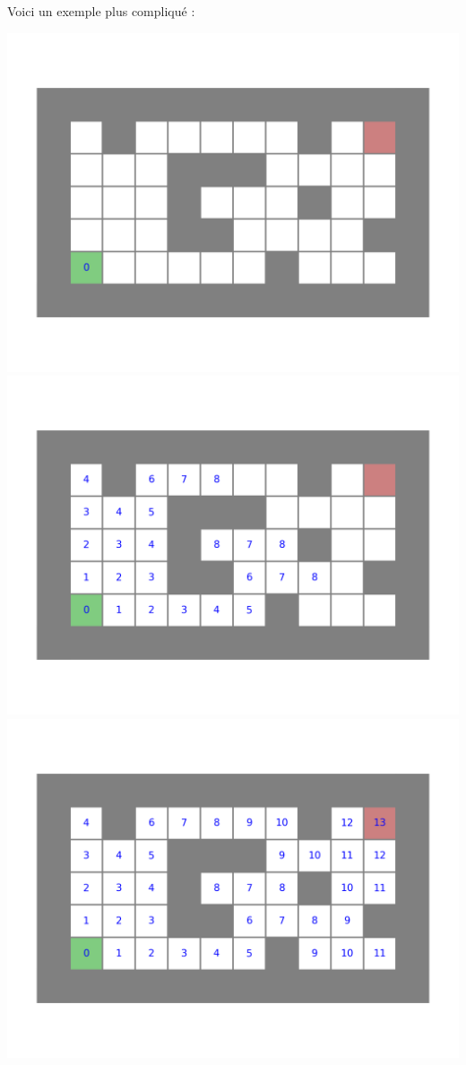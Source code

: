 \documentclass[11pt,class=report,crop=false]{standalone}
\begin{document}
Voici un exemple plus compliqué :
\begin{center}
	\includegraphics[scale=\myscale,scale=0.33]{figures/labyrinthe-01-0}
	\includegraphics[scale=\myscale,scale=0.33]{figures/labyrinthe-01-8}
	\includegraphics[scale=\myscale,scale=0.33]{figures/labyrinthe-01-13}
\end{center}
\end{document}
